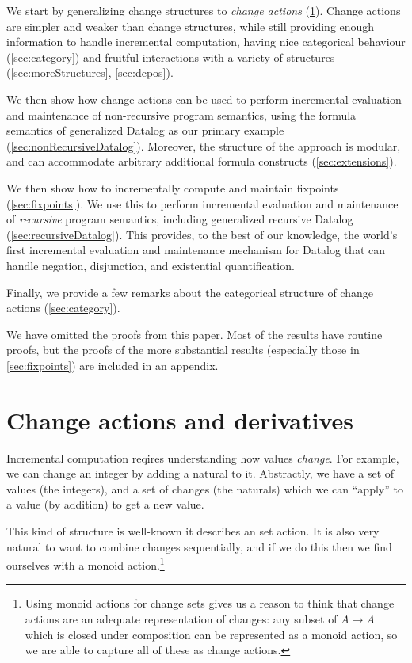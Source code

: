 
We start by generalizing change structures to
\emph{change actions} (\cref{sec:changeActions}). Change actions are simpler and weaker than change
structures, while still providing enough information to handle incremental computation,
having nice categorical behaviour (\cref{sec:category}) and fruitful
interactions with a variety of structures (\cref{sec:moreStructures}, \cref{sec:dcpos}).

We then show how change actions can be used to perform incremental evaluation and maintenance
of non-recursive program semantics, using the formula semantics of generalized Datalog as our primary
example (\cref{sec:nonRecursiveDatalog}). Moreover, the structure of the
approach is modular, and can accommodate arbitrary additional
formula constructs (\cref{sec:extensions}).

We then show how to incrementally compute and maintain fixpoints
(\cref{sec:fixpoints}). We use this to perform incremental evaluation and
maintenance of \emph{recursive} program semantics, including generalized
recursive Datalog (\cref{sec:recursiveDatalog}). This provides, to the best
of our knowledge, the world's first incremental
evaluation and maintenance mechanism for Datalog that can handle negation,
disjunction, and existential quantification. 

Finally, we provide a few remarks about the categorical structure of change
actions (\cref{sec:category}).

We have omitted the proofs from this paper. Most of the results have routine
proofs, but the proofs of the more substantial results
(especially those in \cref{sec:fixpoints}) are included in an appendix.

\section{Change actions and derivatives}
\label{sec:changeActions}

Incremental computation reqires understanding how values \emph{change}. For
example, we can change an integer by adding a natural to it.
Abstractly, we have a set of values (the integers), and a set of changes
(the naturals) which we can ``apply'' to a value (by addition) to get a new value.

This kind of structure is well-known \textemdash{} it describes an set action. It is
also very natural to want to combine changes sequentially, and if we do this
then we find ourselves with a monoid action.\footnote{
Using monoid actions for change sets gives us a reason to think that
change actions are an adequate representation of changes: any subset of $A
\rightarrow A$ which is closed under composition can be
represented as a monoid action, so we are able to capture all of these as change
actions.}


